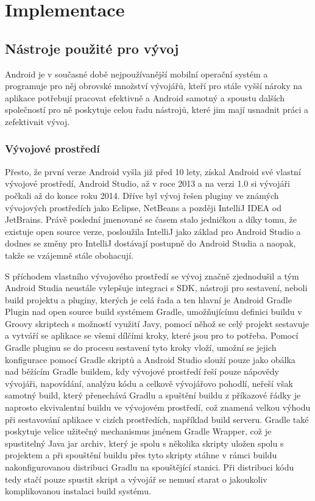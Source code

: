 \documentclass[czech,master,public,dept460,male,java,cpdeclaration]{diploma}
\begin{document}
\section{Implementace}

\subsection{Nástroje použité pro vývoj}
Android je v současné době nejpoužívanější mobilní operační systém a programuje pro něj obrovské
množství vývojářů, kteří pro stále vyšší nároky na aplikace potřebují pracovat efektivně a Android samotný
a spoustu dalších společností pro ně poskytuje celou řadu nástrojů, které jim mají usnadnit práci a zefektivnit vývoj.

\subsubsection{Vývojové prostředí}
Přesto, že první verze Android vyšla již před 10 lety, získal Android své vlastní vývojové prostředí, Android Studio,
až v roce 2013 a na verzi 1.0 si vývojáři počkali až do konce roku 2014. Dříve byl vývoj řešen pluginy ve známých
vývojových prostředích jako Eclipse, NetBeans a později IntelliJ IDEA od JetBrains. Právě poslední jmenované
se časem stalo jedničkou a díky tomu, že existuje open source verze, posloužila IntelliJ jako základ pro Android Studio
a dodnes se změny pro IntelliJ dostávají postupně do Android Studia a naopak, takže se vzájemně stále obohacují.

S příchodem vlastního vývojového prostředí se vývoj značně zjednodušil a tým Android Studia neustále vylepšuje integraci s SDK,
nástroji pro sestavení, neboli build projektu a pluginy, kterých je celá řada a ten hlavní je Android Gradle Plugin
nad open source build systémem Gradle, umožňujícímu definici buildu v Groovy skriptech s možností využití Javy,
 pomocí něhož se celý projekt sestavuje a vytváří se aplikace se všemi dílčími kroky, které jsou pro to potřeba.
Pomocí Gradle pluginu se do procesu sestavení tyto kroky vloží, umožní se jejich konfigurace pomocí Gradle skriptů
a Android Studio slouží pouze jako obálka nad běžícím Gradle buildem, kdy vývojové prostředí řeší pouze nápovědy vývojáři,
napovídání, analýzu kódu a celkově vývojářovo pohodlí, neřeší však samotný build, který přenechává Gradlu a spuštění buildu
 z příkazové řádky je naprosto ekvivalentní buildu ve vývojovém prostředí, což znamená velkou výhodu při sestavování aplikace
 v cizích prostředích, například build serveru.
 Gradle také poskytuje velice užitečný mechanismus jménem Gradle Wrapper, což je spustitelný Java jar archiv,
 který je spolu s několika skripty uložen spolu s projektem a při spouštění buildu přes tyto skripty stáhne v rámci
 buildu nakonfigurovanou distribuci Gradlu na spouštějící stanici. Při distribuci kódu tedy stačí pouze spustit
 skript a vývojář se nemusí starat o jakoukoliv komplikovanou instalaci build systému.
\end{document}
